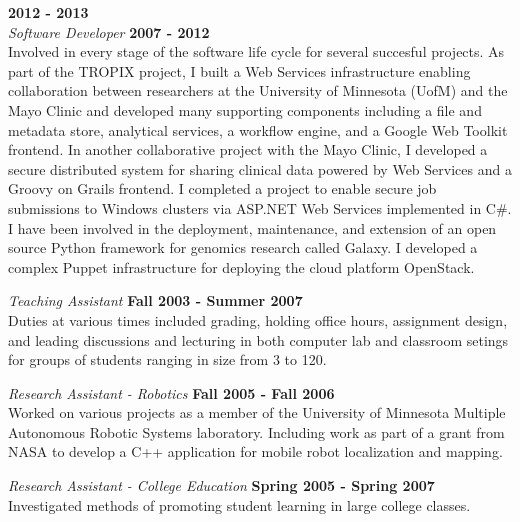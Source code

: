 \documentclass[margin,line]{res}
\begin{document}
\begin{resume}
\vspace{-.3cm}\vspace{-.1cm}{\em Senior Software Developer} \hfill {\bf 2012 - 2013}\\
{\em Software Developer} \hfill {\bf 2007 - 2012}\\
Involved in every stage of the software life cycle for several succesful projects. As part of the TROPIX
project, I built a Web Services infrastructure enabling collaboration between researchers at the
University of Minnesota (UofM) and the Mayo Clinic and developed many supporting components
including a file and metadata store, analytical services, a workflow engine, and a Google Web Toolkit
frontend. In another collaborative project with the Mayo Clinic, I developed a secure distributed
system for sharing clinical data powered by Web Services and a Groovy on Grails frontend. I
completed a project to enable secure job submissions to Windows clusters via ASP.NET Web Services
implemented in C\#. I have been involved in the deployment, maintenance, and extension of an open
source Python framework for genomics research called Galaxy. I developed a complex Puppet infrastructure 
for deploying the cloud platform OpenStack.

{\em Teaching Assistant} \hfill {\bf Fall 2003  - Summer 2007}\\
Duties at various times included grading, holding office hours,
assignment design, and leading discussions and lecturing in both
computer lab and classroom setings for groups of students ranging in
size from 3 to 120.

\vspace{-.1cm}
{\em Research Assistant - Robotics} \hfill {\bf Fall 2005 - Fall 2006}\\
Worked on various projects as a member of the University of Minnesota
Multiple Autonomous Robotic Systems laboratory. Including work as part
of a grant from NASA to develop a C++ application for mobile
robot localization and mapping.

\vspace{-.1cm}
{\em Research Assistant - College Education} \hfill {\bf Spring 2005 - Spring 2007}\\
Investigated methods of promoting student learning in large college classes. 


\end{resume}
\end{document}

